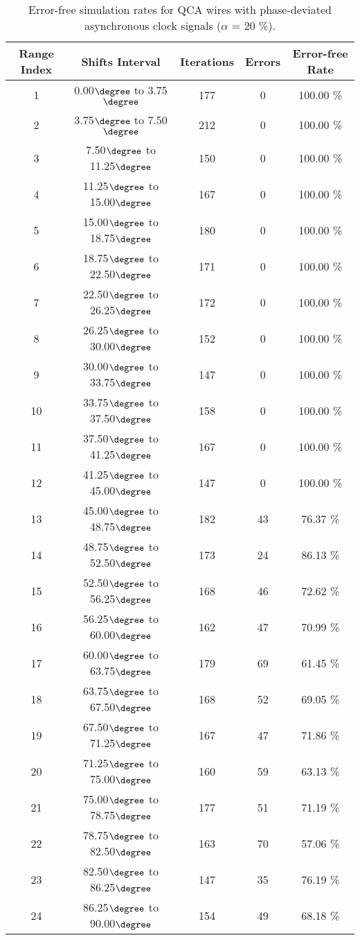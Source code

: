 \flushleft
\begin{table}[h]
\begin{center}
\caption{Error-free simulation rates for QCA wires with phase-deviated asynchronous clock signals ($\alpha$ = 20 \%).}
\begin{tabular}{|c|c|c|c|c|}
\hline
\textbf{Range Index} & \textbf{Shifts Interval} & \textbf{Iterations} & \textbf{Errors} & \textbf{Error-free Rate} \\
\hline
1  &  0.00$\degree$ to  3.75$\degree$ & 177 &  0 & 100.00 \% \\
\hline
2  &  3.75$\degree$ to  7.50$\degree$ & 212 &  0 & 100.00 \% \\
\hline
3  &  7.50$\degree$ to 11.25$\degree$ & 150 &  0 & 100.00 \% \\
\hline
4  & 11.25$\degree$ to 15.00$\degree$ & 167 &  0 & 100.00 \% \\
\hline
5  & 15.00$\degree$ to 18.75$\degree$ & 180 &  0 & 100.00 \% \\
\hline
6  & 18.75$\degree$ to 22.50$\degree$ & 171 &  0 & 100.00 \% \\
\hline
7  & 22.50$\degree$ to 26.25$\degree$ & 172 &  0 & 100.00 \% \\
\hline
8  & 26.25$\degree$ to 30.00$\degree$ & 152 &  0 & 100.00 \% \\
\hline
9  & 30.00$\degree$ to 33.75$\degree$ & 147 &  0 & 100.00 \% \\
\hline
10 & 33.75$\degree$ to 37.50$\degree$ & 158 &  0 & 100.00 \% \\
\hline
11 & 37.50$\degree$ to 41.25$\degree$ & 167 &  0 & 100.00 \% \\
\hline
12 & 41.25$\degree$ to 45.00$\degree$ & 147 &  0 & 100.00 \% \\
\hline
13 & 45.00$\degree$ to 48.75$\degree$ & 182 & 43 &  76.37 \% \\
\hline
14 & 48.75$\degree$ to 52.50$\degree$ & 173 & 24 &  86.13 \% \\
\hline
15 & 52.50$\degree$ to 56.25$\degree$ & 168 & 46 &  72.62 \% \\
\hline
16 & 56.25$\degree$ to 60.00$\degree$ & 162 & 47 &  70.99 \% \\
\hline
17 & 60.00$\degree$ to 63.75$\degree$ & 179 & 69 &  61.45 \% \\
\hline
18 & 63.75$\degree$ to 67.50$\degree$ & 168 & 52 &  69.05 \% \\
\hline
19 & 67.50$\degree$ to 71.25$\degree$ & 167 & 47 &  71.86 \% \\
\hline
20 & 71.25$\degree$ to 75.00$\degree$ & 160 & 59 &  63.13 \% \\
\hline
21 & 75.00$\degree$ to 78.75$\degree$ & 177 & 51 &  71.19 \% \\
\hline
22 & 78.75$\degree$ to 82.50$\degree$ & 163 & 70 &  57.06 \% \\
\hline
23 & 82.50$\degree$ to 86.25$\degree$ & 147 & 35 &  76.19 \% \\
\hline
24 & 86.25$\degree$ to 90.00$\degree$ & 154 & 49 &  68.18 \% \\
\hline


\end{tabular}
\end{center}
\end{table}
